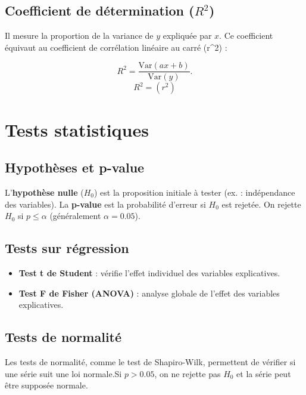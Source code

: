 \documentclass{article}
\begin{document}
\subsection*{Coefficient de détermination (\(R^2\))}
Il mesure la proportion de la variance de \(y\) expliquée par \(x\). Ce coefficient équivaut au coefficient de corrélation linéaire au carré (r^2)
:

\[
R^2 = \frac{\text{Var}(ax+b)}{\text{Var}(y)}.
\]
\[R^2 = (r^2)\]

\section*{Tests statistiques}

\subsection*{Hypothèses et p-value}
L'\textbf{hypothèse nulle} (\(H_0\)) est la proposition initiale à tester (ex. : indépendance des variables). La \textbf{p-value} est la probabilité d’erreur si \(H_0\) est rejetée. On rejette \(H_0\) si \(p \leq \alpha\) (généralement \( \alpha = 0.05 \)).

\subsection*{Tests sur régression}
\begin{itemize}
    \item \textbf{Test t de Student} : vérifie l’effet individuel des variables explicatives.
    \item \textbf{Test F de Fisher (ANOVA)} : analyse globale de l’effet des variables explicatives.
\end{itemize}

\subsection*{Tests de normalité}
Les tests de normalité, comme le test de Shapiro-Wilk, permettent de vérifier si une série suit une loi normale.Si \(p > 0.05\), on ne rejette pas \(H_0\) et la série peut être supposée normale.



\author{}
\date{}


\maketitle
\end{document}
